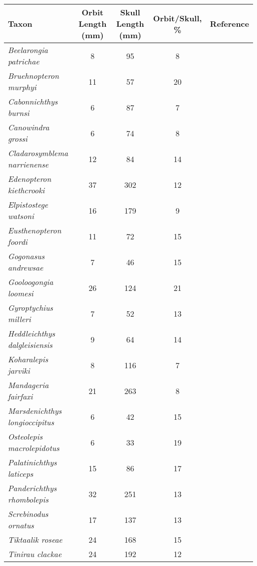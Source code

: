 \begin{tabular}{|L{4.5cm}|c|c|c|L{4.5cm}|}
\hline
\textbf{Taxon}&\textbf{Orbit Length (mm)}&\textbf{Skull Length (mm)}&\textbf{Orbit/Skull, \%}&\textbf{Reference}\\\hline
\textit{Beelarongia patrichae}&8&95&8 &\cite{Long87a}\\\hline
\textit{Bruehnopteron  murphyi}&11&57&20&\cite{Schu12a}\\\hline
\textit{Cabonnichthys burnsi}&6&87&7 &\cite{Ahlb97a}\\\hline
\textit{Canowindra grossi}&6&74&8 &\cite{Long85a}\\\hline
\textit{Cladarosymblema narrienense}&12&84&14&\cite{Fox95a}\\\hline
\textit{Edenopteron kiethcrooki}&37&302&12&\cite{Youn13a}\\\hline
\textit{Elpistostege watsoni}&16&179&9 &\cite{Schu85a}\\\hline
\textit{Eusthenopteron foordi}&11&72&15&\cite{Mark07a}\\\hline
\textit{Gogonasus andrewsae}&7&46&15&\cite{Long06a}\\\hline
\textit{Gooloogongia loomesi}&26&124&21&\cite{Joha98a}\\\hline
\textit{Gyroptychius  milleri}&7&52&13&\cite{Newm15a}\\\hline
\textit{Heddleichthys dalgleisiensis}&9&64&14&\cite{Snit09a}\\\hline
\textit{Koharalepis jarviki}&8&116&7 &\cite{Youn92a}\\\hline
\textit{Mandageria fairfaxi}&21&263&8 &\cite{Joha97a}\\\hline
\textit{Marsdenichthys longioccipitus}&6&42&15&\cite{Holl10a}\\\hline
\textit{Osteolepis macrolepidotus}&6&33&19&\cite{Jarv48a}\\\hline
\textit{Palatinichthys laticeps}&15&86&17&\cite{Witz12a}\\\hline
\textit{Panderichthys rhombolepis}&32&251&13&\cite{Voro91a}\\\hline
\textit{Screbinodus ornatus}&17&137&13&\cite{Jeff12a}\\\hline
\textit{Tiktaalik roseae}&24&168&15&\cite{Daes06a}\\\hline
\textit{Tinirau clackae}&24&192&12&\cite{Swar12a}\\\hline
\end{tabular}
